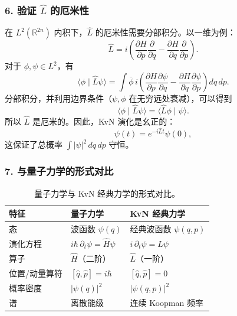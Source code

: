 ﻿\documentclass[10pt,a4paper]{article}
\numberwithin{equation}{section}
\begin{document}
\subsubsection*{6. 验证 $\hat L$ 的厄米性}

在 $L^2(\mathbb{R}^{2n})$ 内积下，$\hat L$ 的厄米性需要分部积分。以一维为例：
\begin{equation}
    \hat L
    =
    i
    \left(
        \frac{\partial H}{\partial p}\frac{\partial}{\partial q}
        -
        \frac{\partial H}{\partial q}\frac{\partial}{\partial p}
    \right).
\end{equation}
对于 $\phi,\psi\in L^2$，有
\begin{equation}
    \langle \phi \mid \hat L\psi \rangle
    =
    \int \overline{\phi}\,
    i
    \left(
        \frac{\partial H}{\partial p}\frac{\partial \psi}{\partial q}
        -
        \frac{\partial H}{\partial q}\frac{\partial \psi}{\partial p}
    \right)
    dq\,dp .
\end{equation}
分部积分，并利用边界条件（$\psi,\phi$ 在无穷远处衰减），可以得到
\begin{equation}
    \langle \phi \mid \hat L\psi \rangle
    =
    \langle \hat L\phi \mid \psi \rangle .
\end{equation}
所以 $\hat L$ 是厄米的。因此，KvN 演化是幺正的：
\begin{equation}
    \psi(t) = e^{-i\hat L t}\psi(0),
\end{equation}
这保证了总概率 $\int |\psi|^2\,dq\,dp$ 守恒。

\subsubsection*{7. 与量子力学的形式对比}

\begin{table}[htbp]
    \centering
    \begin{tabular}{@{}lll@{}}
        \toprule
        特征 & 量子力学 & KvN 经典力学 \\
        \midrule
        态 & 波函数 $\psi(q)$ & 经典波函数 $\psi(q,p)$ \\
        演化方程 & $i\hbar\,\partial_t\psi = \hat H\psi$ & $i\,\partial_t\psi = \hat L\psi$ \\
        算子 & $\hat H$（二阶） & $\hat L$（一阶） \\
        位置/动量算符 & $[\hat q,\hat p]=i\hbar$ & $[\hat q,\hat p]=0$ \\
        概率密度 & $|\psi(q)|^2$ & $|\psi(q,p)|^2$ \\
        谱 & 离散能级 & 连续 Koopman 频率 \\
        \bottomrule
    \end{tabular}
    \caption{量子力学与 KvN 经典力学的形式对比。}
    \label{tab:qm-kvn}
\end{table}
\end{document}
